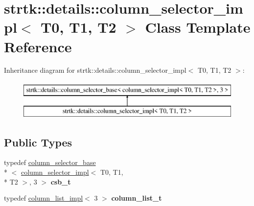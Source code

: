 \hypertarget{classstrtk_1_1details_1_1column__selector__impl_3_01T0_00_01T1_00_01T2_01_4}{\section{strtk\-:\-:details\-:\-:column\-\_\-selector\-\_\-impl$<$ T0, T1, T2 $>$ Class Template Reference}
\label{classstrtk_1_1details_1_1column__selector__impl_3_01T0_00_01T1_00_01T2_01_4}
}
Inheritance diagram for strtk\-:\-:details\-:\-:column\-\_\-selector\-\_\-impl$<$ T0, T1, T2 $>$\-:\begin{figure}[H]
\begin{center}
\leavevmode
\includegraphics[height=2.000000cm]{classstrtk_1_1details_1_1column__selector__impl_3_01T0_00_01T1_00_01T2_01_4}
\end{center}
\end{figure}
\subsection*{Public Types}
\begin{DoxyCompactItemize}
\item 
\hypertarget{classstrtk_1_1details_1_1column__selector__impl_3_01T0_00_01T1_00_01T2_01_4_a20184aa0473aae996863caf2db79769d}{typedef \hyperlink{classstrtk_1_1details_1_1column__selector__base}{column\-\_\-selector\-\_\-base}\\*
$<$ \hyperlink{classstrtk_1_1details_1_1column__selector__impl}{column\-\_\-selector\-\_\-impl}$<$ T0, T1, \\*
T2 $>$, 3 $>$ {\bfseries csb\-\_\-t}}\label{classstrtk_1_1details_1_1column__selector__impl_3_01T0_00_01T1_00_01T2_01_4_a20184aa0473aae996863caf2db79769d}

\item 
\hypertarget{classstrtk_1_1details_1_1column__selector__impl_3_01T0_00_01T1_00_01T2_01_4_aa9812ea24cceb1f91605878b78410f1a}{typedef \hyperlink{structstrtk_1_1details_1_1column__list__impl}{column\-\_\-list\-\_\-impl}$<$ 3 $>$ {\bfseries column\-\_\-list\-\_\-t}}\label{classstrtk_1_1details_1_1column__selector__impl_3_01T0_00_01T1_00_01T2_01_4_aa9812ea24cceb1f91605878b78410f1a}

\end{DoxyCompactItemize}
